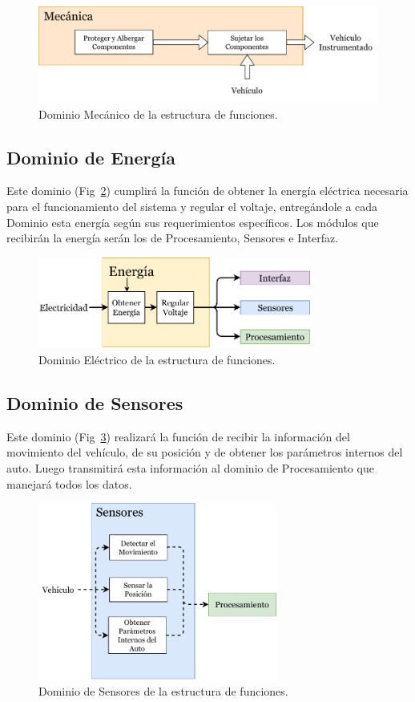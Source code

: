 \begin{figure}[htbp!]
\centering
\includegraphics[width=\textwidth]{mec.pdf}
\caption{Dominio Mecánico de la estructura de funciones.}
\label{fig:3.3}
\end{figure}

\subsection{Dominio de Energía}
Este dominio (Fig~\ref{fig:3.4}) cumplirá la función de obtener la energía eléctrica necesaria para el funcionamiento del sistema y regular el voltaje, entregándole a cada Dominio esta energía según sus requerimientos específicos. Los módulos que recibirán la energía serán los de Procesamiento, Sensores e Interfaz.

\begin{figure}[htbp!]
\centering
\includegraphics[width=0.8\textwidth]{elec.pdf}
\caption{Dominio Eléctrico de la estructura de funciones.}
\label{fig:3.4}
\end{figure}


\subsection{Dominio de Sensores}
Este dominio (Fig~\ref{fig:3.5}) realizará la función de recibir la información del movimiento del vehículo, de su posición y de obtener los parámetros internos del auto. Luego transmitirá esta información al dominio de Procesamiento que manejará todos los datos.

\begin{figure}[htbp!]
\centering
\includegraphics[width=0.7\textwidth]{sens.pdf}
\caption{Dominio de Sensores de la estructura de funciones.}
\label{fig:3.5}
\end{figure}


